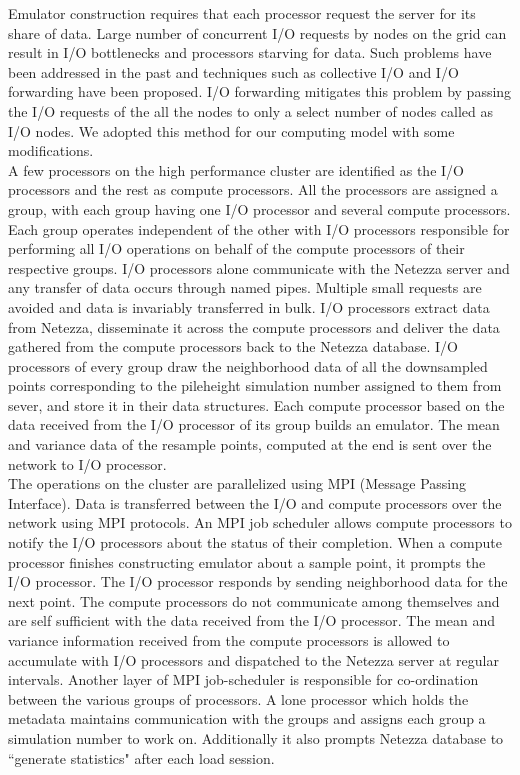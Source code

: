 \documentclass{acm_proc_article-sp}
\begin{document}
Emulator construction requires that each processor request the server for its share of data. Large number of concurrent I/O requests by nodes
on the grid can result in I/O bottlenecks and processors starving for data. Such problems have been addressed in the past and techniques such
as collective I/O\cite{cite4,kotz} and I/O forwarding\cite{cite5} have been proposed. I/O forwarding mitigates this problem by passing the I/O
requests of the all the nodes to only a select number of nodes called as I/O nodes. We adopted this method for our computing model with some
modifications.\\
A few processors on the high performance cluster are identified as the I/O processors and the rest as compute processors. All the processors
are assigned a group, with each group having one I/O processor and several compute processors. Each group operates independent of the other
with I/O processors responsible for performing all I/O operations on behalf of the compute processors of their respective groups. I/O
processors alone communicate with the Netezza server and any transfer of data occurs through named pipes. Multiple small requests are avoided
and data is invariably transferred in bulk. I/O processors extract data from Netezza, disseminate it across the compute processors and deliver
the data gathered from the compute processors back to the Netezza database. I/O processors of every group draw the neighborhood data of all
the downsampled points corresponding to the pileheight simulation number assigned to them from sever, and store it in their data structures.
Each compute processor based on the data received from the I/O processor of its group builds an emulator. The mean and variance data of the
resample points, computed at the end is sent over the network to I/O processor.\\
The operations on the cluster are parallelized using MPI (Message Passing Interface). Data is transferred between the I/O and compute processors
over the network using MPI protocols. An MPI job scheduler allows compute processors to notify the I/O processors about the status of their
completion. When a compute processor finishes constructing emulator about a sample point, it prompts the I/O processor. The I/O processor
responds by sending neighborhood data for the next point. The compute processors do not communicate among themselves and are self sufficient
with the data received from the I/O processor. The mean and variance information received from the compute processors is allowed to accumulate
with I/O processors and dispatched to the Netezza server at regular intervals. Another layer of MPI job-scheduler is responsible for
co-ordination between the various groups of processors. A lone processor which holds the metadata maintains communication with the groups and
assigns each group a simulation number to work on. Additionally it also prompts Netezza database to ``generate statistics" after each load
session.
\end{document}
